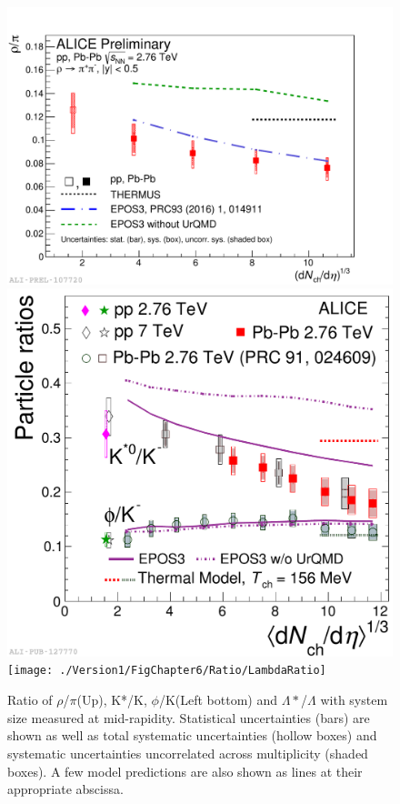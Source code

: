 \begin{figure}[htbp]
\begin{center}
\includegraphics[width=8.cm]{./Version1/FigChapter6/Ratio/RhoRatio}
\hspace{0.5cm}
\includegraphics[width=7.cm]{./Version1/FigChapter6/Ratio/KPhiRatio}
\hspace{0.5cm}
\texttt{[image: ./Version1/FigChapter6/Ratio/LambdaRatio]}
\caption{Ratio of $\rho$/$\pi$(Up), K*/K, $\phi$/K(Left bottom) and $\Lambda*$/$\Lambda$ with system size measured at mid-rapidity. Statistical uncertainties (bars) are shown as well as total systematic uncertainties (hollow boxes) and systematic uncertainties uncorrelated across multiplicity (shaded boxes). A few model predictions are also shown as lines at their appropriate abscissa.}
\label{fig:rsnratio}
\end{center}
\end{figure}


\newpage
